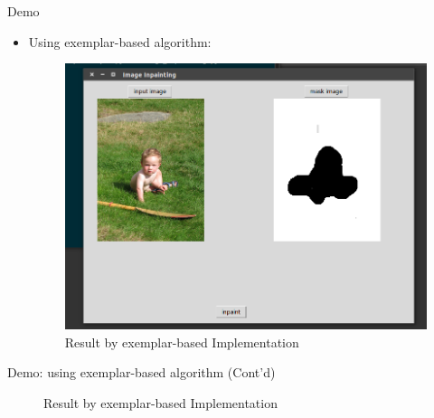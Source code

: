 \documentclass{beamer}
\begin{document}
\begin{frame}{Demo}
	\begin{itemize}
		\item Using exemplar-based algorithm:
		\begin{figure}
			\centering
			\includegraphics[width=0.8\linewidth]{eb_result.png}
			\caption{Result by exemplar-based Implementation}
		\end{figure}
	\end{itemize}
\end{frame}

\begin{frame}{Demo: using exemplar-based algorithm (Cont'd)}
		\begin{figure}
		  \centering
		  \qquad
		\caption{Result by exemplar-based Implementation}
		\end{figure}
\end{frame}
\end{document}
